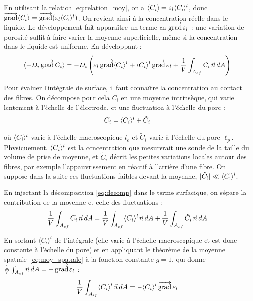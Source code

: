 \noindent En utilisant la relation \eqref{eq:relation_moy},
\noindent on a $\langle C_i \rangle = \varepsilon_l \langle C_i \rangle^l$,
donc $\mathop{\overrightarrow{\operatorname{grad}}}\nolimits\langle C_i \rangle = \mathop{\overrightarrow{\operatorname{grad}}}\nolimits(\varepsilon_l \langle C_i \rangle^l)$. On revient ainsi à
la concentration réelle dans le liquide. Le développement fait apparaître un
terme en $\mathop{\overrightarrow{\operatorname{grad}}}\nolimits\varepsilon_l$ : une variation de porosité suffit à faire varier
la moyenne superficielle, même si la concentration dans le liquide est
uniforme. En développant :
\begin{equation}
\langle -D_i \mathop{\overrightarrow{\operatorname{grad}}}\nolimits C_i \rangle= -D_i \left(\varepsilon_l \mathop{\overrightarrow{\operatorname{grad}}}\nolimits\langle C_i \rangle^l + \langle C_i \rangle^l \mathop{\overrightarrow{\operatorname{grad}}}\nolimits\varepsilon_l
+ \frac{1}{V}\int_{A_{sf}} C_i\,\vec{n}\, dA \right)
\end{equation}

Pour évaluer l'intégrale de surface, il faut connaître la concentration au
contact des fibres. On décompose pour cela $C_i$ en une moyenne intrinsèque,
qui varie lentement à l'échelle de l'électrode, et une fluctuation à l'échelle
du pore :
\begin{equation}
C_i = \langle C_i \rangle^l + \tilde{C}_i
\label{eq:decomp}
\end{equation}

où $\langle C_i \rangle^l$ varie à l'échelle macroscopique $l_e$ et $\tilde{C}_i$
varie à l'échelle du pore $\ell_p$. Physiquement, $\langle C_i \rangle^l$ est la
concentration que mesurerait une sonde de la taille du volume de prise de
moyenne, et $\tilde{C}_i$ décrit les petites variations locales autour des
fibres, par exemple l'appauvrissement en réactif à l'arrière d'une fibre. On
suppose dans la suite ces fluctuations faibles devant la moyenne,
$|\tilde{C}_i| \ll \langle C_i \rangle^l$.



\noindent En injectant la décomposition \eqref{eq:decomp} dans le terme surfacique,
on sépare la contribution de la moyenne et celle des fluctuations :
\begin{equation}
\frac{1}{V}\int_{A_{sf}} C_i\,\vec{n}\, dA
= \frac{1}{V}\int_{A_{sf}} \langle C_i \rangle^l\,\vec{n}\, dA
+ \frac{1}{V}\int_{A_{sf}} \tilde{C}_i\,\vec{n}\, dA
\end{equation}

En sortant $\langle C_i\rangle^l$ de l'intégrale (elle varie à l'échelle
macroscopique et est donc constante à l'échelle du pore) et en appliquant le
théorème de la moyenne spatiale~\eqref{eq:moy_spatiale} à la fonction
constante $g = 1$, qui donne $\frac{1}{V}\int_{A_{sf}} \vec{n}\, dA = -\mathop{\overrightarrow{\operatorname{grad}}}\nolimits\varepsilon_l$ :
\begin{equation}
\frac{1}{V}\int_{A_{sf}} \langle C_i \rangle^l\,\vec{n}\, dA = -\langle C_i \rangle^l \mathop{\overrightarrow{\operatorname{grad}}}\nolimits\varepsilon_l
\end{equation}

